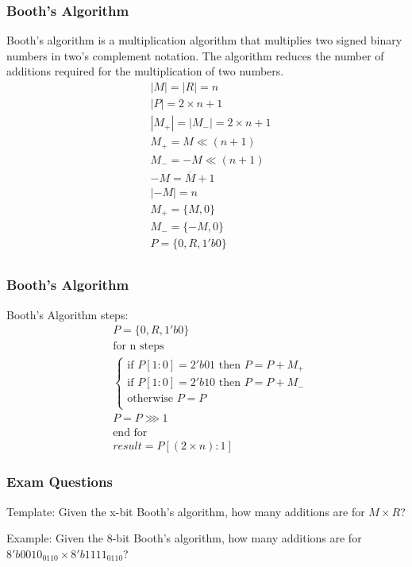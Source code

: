 \begin{frame}
    \frametitle{Booth's Algorithm}
 Booth's algorithm is a multiplication algorithm that multiplies two signed binary numbers in two's complement notation.
 The algorithm reduces the number of additions required for the multiplication of two numbers.
    \begin{equation}
        \begin{aligned}
            &|M|=|R|=n\\
            &|P|=2 \times n + 1\\
            &|M_{+}|=|M_{-}|=2 \times n+1\\
            &M_{+}=M \ll (n + 1)\\
            &M_{-}=-M \ll (n + 1)\\
            &-M=\overline{M}+1\\
            &|-M|=n\\
            &M_{+}=\{M, 0\}\\
            &M_{-}=\{-M, 0\}\\
            &P=\{0,R,1'b0\}\\
        \end{aligned}
    \end{equation}
\end{frame}

\begin{frame}
    \frametitle{Booth's Algorithm}
 Booth's Algorithm steps:
    \begin{equation}
        \begin{aligned}
            &P=\{0,R,1'b0\}\\
            &\text{for n steps}\\
            &\begin{cases}
 \text{if } P[1:0]=2'b01 \text{ then } P=P+M_{+}\\
 \text{if } P[1:0]=2'b10 \text{ then } P=P+M_{-}\\
 \text{otherwise } P=P\\
            \end{cases}\\
            &P=P \ggg 1\\
            &\text{end for}\\
            &result=P[(2 \times n):1]
        \end{aligned}
    \end{equation}
\end{frame}

\begin{frame}
    \frametitle{Exam Questions}
 Template: Given the x-bit Booth's algorithm, how many additions are for $M \times R$?

 Example: Given the 8-bit Booth's algorithm, how many additions are for $8'b0010_0110 \times 8'b1111_0110$?
\end{frame}


